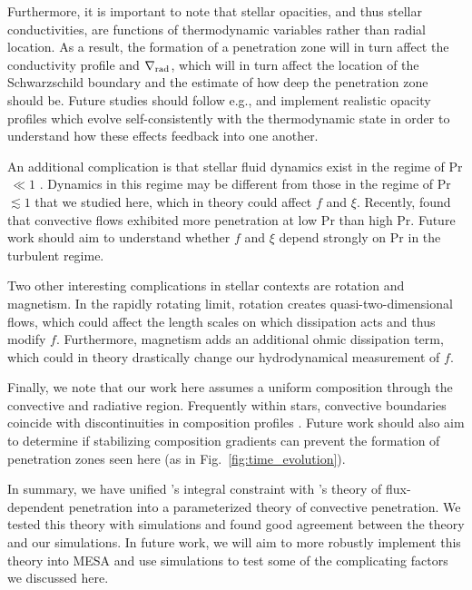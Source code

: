 \documentclass[twocolumn]{aastex631}
\newcommand{\gradrad}{\ensuremath{\nabla_{\rm{rad}}}}
\newcommand\Pran{\ensuremath{\mathrm{Pr}}}
\begin{document}
Furthermore, it is important to note that stellar opacities, and thus stellar conductivities, are functions of thermodynamic variables rather than radial location.
As a result, the formation of a penetration zone will in turn affect the conductivity profile and $\gradrad$, which will in turn affect the location of the Schwarzschild boundary and the estimate of how deep the penetration zone should be.
Future studies should follow e.g., \citet{kapyla_etal_2017} and implement realistic opacity profiles which evolve self-consistently with the thermodynamic state in order to understand how these effects feedback into one another.

An additional complication is that stellar fluid dynamics exist in the regime of Pr$\,\ll1$ \citep{garaud2021}.
Dynamics in this regime may be different from those in the regime of Pr $\lesssim 1$ that we studied here, which in theory could affect $f$ and $\xi$.
Recently, \citet{kapyla2021} found that convective flows exhibited more penetration at low Pr than high Pr.
Future work should aim to understand whether $f$ and $\xi$ depend strongly on $\Pran$ in the turbulent regime.

Two other interesting complications in stellar contexts are rotation and magnetism.
In the rapidly rotating limit, rotation creates quasi-two-dimensional flows, which could affect the length scales on which dissipation acts and thus modify $f$.
Furthermore, magnetism adds an additional ohmic dissipation term, which could in theory drastically change our hydrodynamical measurement of $f$.

Finally, we note that our work here assumes a uniform composition through the convective and radiative region.
Frequently within stars, convective boundaries coincide with discontinuities in composition profiles \citep{salaris_cassisi_2017}.
Future work should also aim to determine if stabilizing composition gradients can prevent the formation of penetration zones seen here (as in Fig.~\ref{fig:time_evolution}).

In summary, we have unified \citet{roxburgh1989}'s integral constraint with \citet{zahn1991}'s theory of flux-dependent penetration into a parameterized theory of convective penetration.
We tested this theory with simulations and found good agreement between the theory and our simulations.
In future work, we will aim to more robustly implement this theory into MESA and use simulations to test some of the complicating factors we discussed here.
\end{document}

